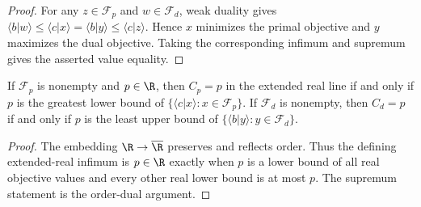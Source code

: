 \begin{proof}
    \leanok
    For any $z\in\mathcal F_p$ and $w\in\mathcal F_d$, weak duality gives
    $\langle b|w\rangle\leq\langle c|x\rangle
    =\langle b|y\rangle\leq\langle c|z\rangle$.  Hence $x$ minimizes the
    primal objective and $y$ maximizes the dual objective.  Taking the
    corresponding infimum and supremum gives the asserted value equality.
\end{proof}

\begin{theorem}
    \label{thm:conic_finite_value_extrema}
    \leanok
    If $\mathcal F_p$ is nonempty and $p\in\R$, then $C_p=p$ in the
    extended real line if and only if $p$ is the greatest lower bound of
    $\{\langle c|x\rangle:x\in\mathcal F_p\}$.  If $\mathcal F_d$ is
    nonempty, then $C_d=p$ if and only if $p$ is the least upper bound of
    $\{\langle b|y\rangle:y\in\mathcal F_d\}$.
\end{theorem}

\begin{proof}
    \leanok
    The embedding $\R\to\overline{\R}$ preserves and reflects order.  Thus
    the defining extended-real infimum is $p\in\R$ exactly when $p$ is a
    lower bound of all real objective values and every other real lower bound
    is at most $p$.  The supremum statement is the order-dual argument.
\end{proof}


